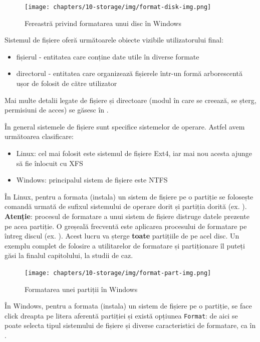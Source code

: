 \begin{figure}[!htbp]
  \centering
  \texttt{[image: chapters/10-storage/img/format-disk-img.png]}
  \caption{Fereastră privind formatarea unui disc în Windows}
  \label{fig:storage:format-disk}
\end{figure}

Sistemul de fișiere oferă următoarele obiecte vizibile utilizatorului final:

\begin{itemize}
  \item fișierul - entitatea care conține date utile în diverse formate
  \item directorul - entitatea care organizează fișierele într-un formă arborescentă ușor de folosit de către utilizator
\end{itemize}

Mai multe detalii legate de fișiere și directoare (modul în care se creează, se șterg, permisiuni de acces) se găsesc în .

În general sistemele de fișiere sunt specifice sistemelor de operare.
Astfel avem următoarea clasificare:

\begin{itemize}
  \item Linux: cel mai folosit este sistemul de fișiere Ext4, iar mai nou acesta ajunge să fie înlocuit cu XFS
  \item Windows: principalul sistem de fișiere este NTFS
\end{itemize}

În Linux, pentru a formata (instala) un sistem de fișiere pe o partiție se folosește comandă  urmată de sufixul sistemului de operare dorit și partiția dorită (ex. ).
\textbf{Atenție}: procesul de formatare a unui sistem de fișiere distruge datele prezente pe acea partiție.
O greșeală frecventă este aplicarea procesului de formatare pe întreg discul (ex. ).
Acest lucru va șterge \textbf{toate} partițiile de pe acel disc.
Un exemplu complet de folosire a utilitarelor de formatare și partiționare îl puteți găsi la finalul capitolului, la studii de caz.

\begin{figure}[!htbp]
  \centering
  \texttt{[image: chapters/10-storage/img/format-part-img.png]}
  \caption{Formatarea unei partiții în Windows}
  \label{fig:storage:win-format}
\end{figure}

În Windows, pentru a formata (instala) un sistem de fișiere pe o partiție, se face click dreapta pe litera aferentă partiției și există opțiunea \texttt{Format}: de aici se poate selecta tipul sistemului de fișiere și diverse caracteristici de formatare, ca în .

